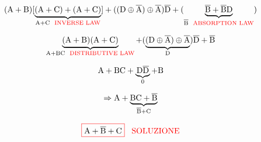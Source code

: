 \begin{equation*}
	(\A + \B)[\underbrace{(\A + \C) + (\A + \C)} _{\A + \C \hspace{0.2cm}\inverse}]
	+ ((\D\oplus\negatoA)\oplus\negatoA)\negatoD + (\underbrace{\negatoB +\negatoB\D} _{\negatoB \hspace{0.2cm}\absorption})
\end{equation*}

\begin{equation*}
	\underbrace{(\A + \B)(\A + \C)} _{\A + \B\C \hspace{0.2cm}\distr} +
	(\underbrace{(\D \oplus \negatoA)\oplus \negatoA} _{\D}) \negatoD + \negatoB
\end{equation*}

\begin{equation*}
	\A + \B\C + \underbrace{\D\negatoD} _{0} + \B
\end{equation*}

\begin{equation*}
	\Rightarrow \A + \underbrace{\B\C + \negatoB} _{\negatoB + \C}
\end{equation*}

\begin{equation*}
	\color{red}\boxed{\normalcolor \A + \negatoB + \C} \hspace{0.3cm}\SOLUZIONE
\end{equation*}


